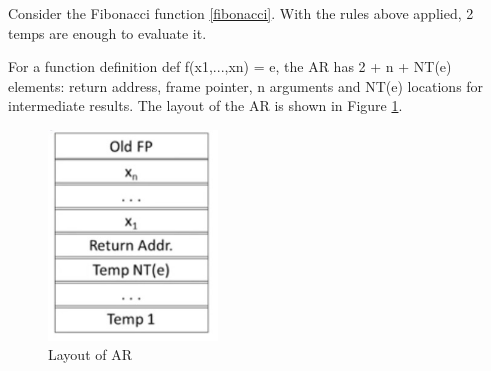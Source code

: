 Consider the Fibonacci function \eqref{fibonacci}. With the rules above applied, 2 temps are enough to evaluate it.

For a function definition \textsf{def f(x1,...,xn) = e}, the AR has \textsf{2 + n + NT(e)} elements: return address, frame pointer, n arguments and NT(e) locations for intermediate results. The layout of the AR is shown in Figure \ref{arlayout}.
\begin{figure}[H]
\centering
\includegraphics[width = 0.4\textwidth]{arlayout.jpg}
\caption{Layout of AR}\label{arlayout}
\end{figure}
\ifx\PREAMBLE\undefined

\fi